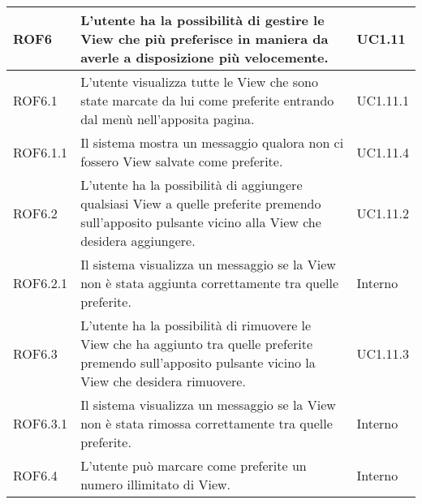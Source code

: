 \begin{center}
\begin{longtable}{| p{2.5cm} | p{8cm} | p{2cm} |}
		ROF6  & L'utente ha la possibilità di gestire le View che più preferisce in maniera da averle a disposizione più velocemente. & UC1.11 \\
		\hline
		ROF6.1  & L'utente visualizza tutte le View che sono state marcate da lui come preferite entrando dal menù nell'apposita pagina. & UC1.11.1 \\
		\hline
		ROF6.1.1  & Il sistema mostra un messaggio qualora non ci fossero View salvate come preferite. &  UC1.11.4 \\
		\hline
		ROF6.2  & L'utente ha la possibilità di aggiungere qualsiasi View a quelle preferite premendo sull'apposito pulsante vicino alla View che desidera aggiungere.  & UC1.11.2 \\
		\hline
		ROF6.2.1  & Il sistema visualizza un messaggio se la View non è stata aggiunta correttamente tra quelle preferite.  & Interno \\
		\hline
		ROF6.3  & L'utente ha la possibilità di rimuovere le View che ha aggiunto tra quelle preferite premendo sull'apposito pulsante vicino la View che desidera rimuovere.  &  UC1.11.3 \\
		\hline
		ROF6.3.1  & Il sistema visualizza un messaggio se la View non è stata rimossa correttamente tra quelle preferite.  &  Interno \\
		\hline
		ROF6.4 & L'utente può marcare come preferite un numero illimitato di View. &  Interno \\
		\hline



\end{longtable}
\end{center}
